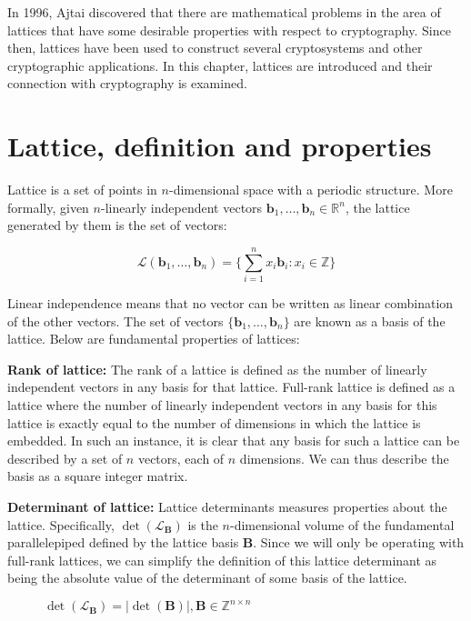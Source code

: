 In 1996, Ajtai discovered that there are mathematical problems in the area of lattices that have some desirable properties with respect to cryptography. Since then, lattices have been used to construct several
cryptosystems and other cryptographic applications. In this chapter, lattices are introduced and their connection with cryptography is examined.

\section{Lattice, definition and properties}
Lattice is a set of points in $n$-dimensional space with a periodic structure. More formally, given $n$-linearly independent vectors $\textbf{b}_1, \dots, \textbf{b}_n \in \mathbb{R}^n$, the lattice generated by them is the set of vectors:

\[\mathcal{L}(\textbf{b}_1, \dots, \textbf{b}_n) = \bigg\{\sum_{i=1}^{n} x_i \textbf{b}_i: x_i \in \mathbb{Z} \bigg\}\]

Linear independence means that no vector can be written as linear combination of the other vectors. The set of vectors $\{\textbf{b}_1, \dots , \textbf{b}_n\}$ are known as a basis of the lattice. Below are fundamental properties of lattices:


\textbf{Rank of lattice:}
The rank of a lattice is defined as the number of linearly independent vectors in any basis for that lattice. Full-rank lattice is defined as a lattice where the number of linearly independent vectors in any basis for this lattice is exactly equal to the number of dimensions in which the lattice is embedded. In such an instance, it is clear that any basis for such a lattice can be described by a set of $n$ vectors, each of $n$ dimensions. We can thus describe the basis as a square integer matrix.

\textbf{Determinant of lattice:}
Lattice determinants measures properties about the lattice. Specifically, $\det(\mathcal{L}_\textbf{B})$ is the $n$-dimensional volume of the fundamental parallelepiped defined by the lattice basis $\textbf{B}$. Since we will only be operating with full-rank lattices, we can simplify the definition of this lattice determinant as being the absolute value of the determinant of some basis of the lattice.

\begin{figure}[H]
	\centering
	$\det(\mathcal{L}_\textbf{B} ) = |\det(\textbf{B})|, \textbf{B} \in \mathbb{Z}^{n \times n}$
\end{figure}

